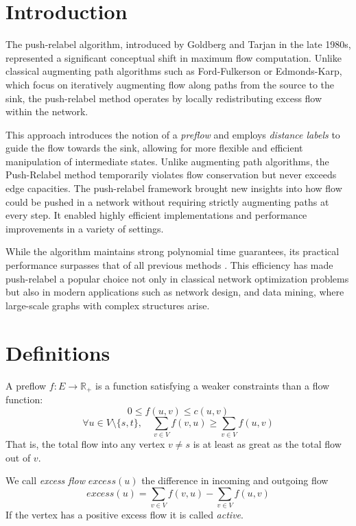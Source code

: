 
\section{Introduction}

The push-relabel algorithm, introduced by Goldberg and Tarjan \cite{PushRelabel} in the late 1980s, represented a significant conceptual shift in maximum flow computation. Unlike classical augmenting path algorithms such as Ford-Fulkerson or Edmonds-Karp, which focus on iteratively augmenting flow along paths from the source to the sink, the push-relabel method operates by locally redistributing excess flow within the network. 

This approach introduces the notion of a \emph{preflow} and employs \emph{distance labels} to guide the flow towards the sink, allowing for more flexible and efficient manipulation of intermediate states. Unlike augmenting path algorithms, the Push-Relabel method temporarily violates flow conservation but never exceeds edge capacities. The push-relabel framework brought new insights into how flow could be pushed in a network without requiring strictly augmenting paths at every step. It enabled highly efficient implementations and performance improvements in a variety of settings. 

While the algorithm maintains strong polynomial time guarantees, its practical performance surpasses that of all previous methods \cite{cherkassky1997pushrelabel}. This efficiency has made push-relabel a popular choice not only in classical network optimization problems but also in modern applications such as network design, and data mining, where large-scale graphs with complex structures arise.

\section{Definitions}

\begin{defn}
A preflow $f:E \to \mathbb{R_+} $ is a function satisfying a weaker constraints than a flow function:
$$ 0 \leq f(u,v) \leq c(u,v) $$
$$ 
\forall u \in V \setminus \{s, t\}, \quad
\sum_{v \in V} f(v,u)  \geq \sum_{v \in V} f(u,v)
$$
That is, the total flow into any vertex $v \neq s$ is at least as great as the total flow out of $v$.
\end{defn}

\begin{defn}
We call \emph{excess flow} $excess(u)$ the difference in incoming and outgoing flow 
$$ excess(u) = \sum_{v \in V} f(v,u)  - \sum_{v \in V} f(u,v)$$
If the vertex has a positive excess flow it is called \emph{active}.
\end{defn}

